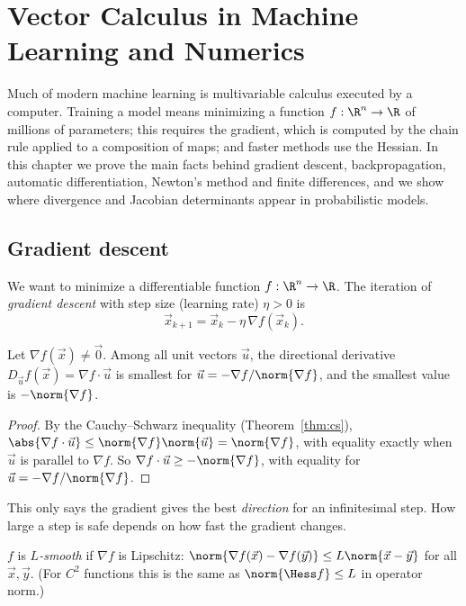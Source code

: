 \chapter{Vector Calculus in Machine Learning and Numerics}
\label{ch:ml}

Much of modern machine learning is multivariable calculus executed by a computer. Training a model means minimizing a function $f:\R^n\to\R$ of millions of parameters; this requires the gradient, which is computed by the chain rule applied to a composition of maps; and faster methods use the Hessian. In this chapter we prove the main facts behind gradient descent, backpropagation, automatic differentiation, Newton's method and finite differences, and we show where divergence and Jacobian determinants appear in probabilistic models.

\section{Gradient descent}

We want to minimize a differentiable function $f:\R^n\to\R$. The iteration of \emph{gradient descent} with step size (learning rate) $\eta>0$ is
\[
\vec x_{k+1}=\vec x_k-\eta\,\nabla f(\vec x_k).
\]

\begin{theorem}\label{thm:steepest}
Let $\nabla f(\vec x)\ne\vec0$. Among all unit vectors $\vec u$, the directional derivative $D_{\vec u}f(\vec x)=\nabla f\cdot\vec u$ is smallest for $\vec u=-\nabla f/\norm{\nabla f}$, and the smallest value is $-\norm{\nabla f}$.
\end{theorem}

\begin{proof}
By the Cauchy--Schwarz inequality (Theorem~\ref{thm:cs}), $\abs{\nabla f\cdot\vec u}\le\norm{\nabla f}\norm{\vec u}=\norm{\nabla f}$, with equality exactly when $\vec u$ is parallel to $\nabla f$. So $\nabla f\cdot\vec u\ge-\norm{\nabla f}$, with equality for $\vec u=-\nabla f/\norm{\nabla f}$.
\end{proof}

This only says the gradient gives the best \emph{direction} for an infinitesimal step. How large a step is safe depends on how fast the gradient changes.

\begin{definition}[$L$-smooth]
$f$ is \emph{$L$-smooth} if $\nabla f$ is Lipschitz: $\norm{\nabla f(\vec x)-\nabla f(\vec y)}\le L\norm{\vec x-\vec y}$ for all $\vec x,\vec y$. (For $C^2$ functions this is the same as $\norm{\Hess f}\le L$ in operator norm.)
\end{definition}

